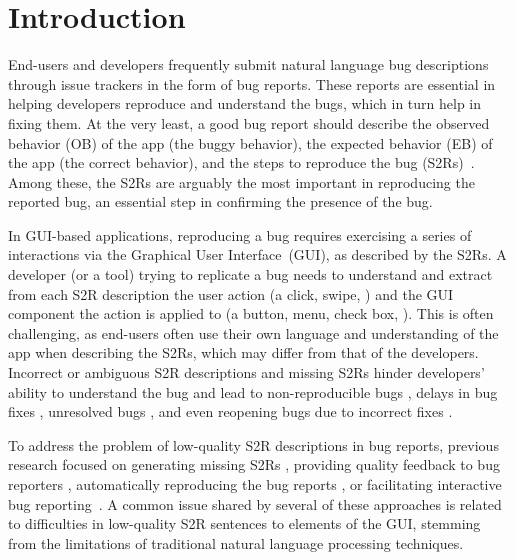 
\section{Introduction}
\label{sec:intro}

End-users and developers frequently submit natural language bug descriptions through issue trackers in the form of bug reports.
These reports are essential in helping developers reproduce and understand the bugs, which in turn help in fixing them.
At the very least, a good bug report should describe the observed behavior (OB) of the app (\ie the buggy behavior), the expected behavior (EB) of the app (\ie the correct behavior), and the steps to reproduce the bug (S2Rs)~\cite{Zimmermann2010, Bettenburg2008GoodBR}.
Among these, the S2Rs are arguably the most important in reproducing the reported bug, an essential step in confirming the presence of the bug.

In GUI-based applications, reproducing a bug requires exercising a series of interactions via the Graphical User Interface~(GUI), as described by the S2Rs.
A developer (or a tool) trying to replicate a bug needs to understand and extract from each S2R description the user action (a click, swipe, \etc) and the GUI component the action is applied to (a button, menu, check box, \etc). 
This is often challenging, as end-users often use their own language and understanding of the app when describing the S2Rs, which may differ from that of the developers.
Incorrect or ambiguous S2R descriptions and missing S2Rs hinder developers' ability to understand the bug and lead to non-reproducible bugs \cite{ErfaniJoorabchi2014}, delays in bug fixes \cite{Guo2010, Zimmermann2012}, unresolved bugs \cite{Guo2010}, and even reopening bugs due to incorrect fixes \cite{Zimmermann2012}.

To address the problem of low-quality S2R descriptions in bug reports, previous research focused on generating missing S2Rs \cite{Bo2024}, providing quality feedback to bug reporters \cite{Chaparro2019}, automatically reproducing the bug reports  \cite{Fazzini2018}, or facilitating interactive bug reporting~\cite{song2022burt,Moran2015,song2020bee}.
A common issue shared by several of these approaches is related to difficulties in  low-quality S2R sentences to elements of the GUI, stemming from the limitations of traditional natural language processing techniques.

